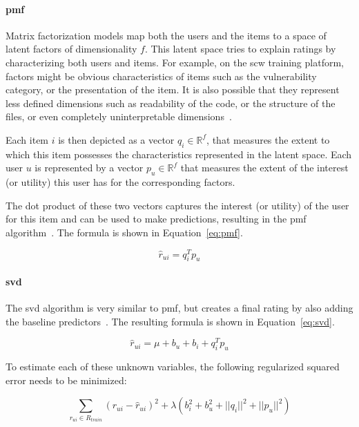 \paragraph{\gls{pmf}}
Matrix factorization models map both the users and the items to a space of latent factors of dimensionality $f$.
This latent space tries to explain ratings by characterizing both users and items.
For example, on the \gls{scw} training platform, factors might be obvious characteristics of items such as the vulnerability category, or the presentation of the item.
It is also possible that they represent less defined dimensions such as readability of the code, or the structure of the files, or even completely uninterpretable dimensions~\cite{Ricci2010}.

Each item $i$ is then depicted as a vector $q_i \in \mathbb{R}^f$, that measures the extent to which this item possesses the characteristics represented in the latent space.
Each user $u$ is represented by a vector $p_u \in \mathbb{R}^f$ that measures the extent of the interest (or utility) this user has for the corresponding factors.

The dot product of these two vectors captures the interest (or utility) of the user for this item and can be used to make predictions, resulting in the \gls{pmf} algorithm~\cite{mnih2008probabilistic,Hug2020}.
The formula is shown in Equation~\ref{eq:pmf}.

\begin{equation}
  \label{eq:pmf}
  \hat{r}_{ui} = q_i^T p_u 
\end{equation}

\paragraph{\gls{svd}}
The \gls{svd} algorithm is very similar to \gls{pmf}, but creates a final rating by also adding the baseline predictors~\cite{koren2009matrix, Ricci2010, Hug2020}. 
The resulting formula is shown in Equation~\ref{eq:svd}.

\begin{equation}
  \label{eq:svd}
  \hat{r}_{ui} = \mu + b_u + b_i + q_i^T p_u 
\end{equation}

To estimate each of these unknown variables, the following regularized squared error needs to be minimized:

\begin{equation}
     \sum_{r_{ui} \in R_{train}} \left(r_{ui} - \hat{r}_{ui} \right)^2 +
        \lambda\left(b_i^2 + b_u^2 + ||q_i||^2 + ||p_u||^2\right)
\end{equation}


